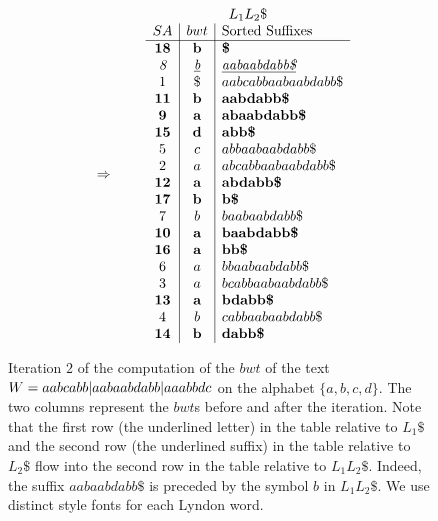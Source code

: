 \documentclass[envcountsame,runningheads]{llncs}
\begin{document}
\begin{example}
\begin{figure}[!htb]
{$$\begin{array}{c}
    \Rightarrow
    \\
    \end{array}\qquad
\begin{array}{c|c|l}
    \multicolumn{3}{c}{L_1L_2\$}      \\
SA    & bwt   & \mbox{Sorted Suffixes} \\
\hline
\textbf{18} & \textbf{b} & \textbf{\$} \\
\textit{8} & \textit{\underline{b}} & \textit{\underline{aabaabdabb\$}} \\
1     & \$    & aabcabbaabaabdabb\$ \\
\textbf{11} & \textbf{b} & \textbf{aabdabb\$} \\
\textbf{9} & \textbf{a} & \textbf{abaabdabb\$} \\
\textbf{15} & \textbf{d} & \textbf{abb\$} \\
5     & c     & abbaabaabdabb\$ \\
2     & a     & abcabbaabaabdabb\$ \\
\textbf{12} & \textbf{a} & \textbf{abdabb\$} \\
\textbf{17} & \textbf{b} & \textbf{b\$} \\
7     & b     & baabaabdabb\$ \\
\textbf{10} & \textbf{a} & \textbf{baabdabb\$} \\
\textbf{16} & \textbf{a} & \textbf{bb\$} \\
6     & a     & bbaabaabdabb\$ \\
3     & a     & bcabbaabaabdabb\$ \\
\textbf{13} & \textbf{a} & \textbf{bdabb\$} \\
4     & b     & cabbaabaabdabb\$ \\
\textbf{14} & \textbf{b} & \textbf{dabb\$} \\
\end{array}
    $$
}   \caption{
Iteration $2$ of the computation of the $bwt$ of the text $W = aabcabb|aabaabdabb|aaabbdc$ on the alphabet $\{a,b,c,d\}$.
The two columns represent the $bwt$s before and after the iteration.
Note that the first row (the underlined letter) in the table relative to $L_1\$$ and the second row (the underlined suffix) in the table relative to $L_2\$$ flow into the second row in the table relative to $L_1L_2\$$.
Indeed, the suffix $aabaabdabb\$$  is preceded by the symbol $b$ in $L_1L_2\$$.
We use distinct style fonts for each Lyndon word.
}\label{fig:1}
\end{figure}
\end{example}
\end{document}

